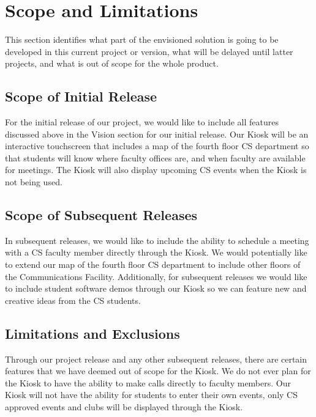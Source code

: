 \section{Scope and Limitations}
This section identifies what part of the envisioned solution is going to be
developed in this current project or version, what will be delayed until
latter projects, and what is out of scope for the whole product.  

\subsection{Scope of Initial Release}
For the initial release of our project, we would like to include all features discussed above in the Vision section for our initial release. Our Kiosk will be an interactive touchscreen that includes a map of the fourth floor CS department so that students will know where faculty offices are, and when faculty are available for meetings. The Kiosk will also display upcoming CS events when the Kiosk is not being used. 

\subsection{Scope of Subsequent Releases}
In subsequent releases, we would like to include the ability to schedule a meeting with a CS faculty member directly through the Kiosk. We would potentially like to extend our map of the fourth floor CS department to include other floors of the Communications Facility. Additionally, for subsequent releases we would like to include student software demos through our Kiosk so we can feature new and creative ideas from the CS students. 

\subsection{Limitations and Exclusions}
Through our project release and any other subsequent releases, there are certain features that we have deemed out of scope for the Kiosk. We do not ever plan for the Kiosk to have the ability to make calls directly to faculty members. Our Kiosk will not have the ability for students to enter their own events, only CS approved events and clubs will be displayed through the Kiosk. 

